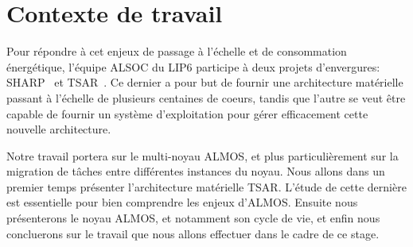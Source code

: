 \section{Contexte de travail}
\label{sec:context}

  

  Pour répondre à cet enjeux de passage à l'échelle et de consommation
  énergétique, l'équipe ALSOC du LIP6 participe à deux projets d'envergures:
  SHARP~\cite{sharp2012} et TSAR~\cite{tsar2008}. Ce dernier a pour but de
  fournir une architecture matérielle passant à l'échelle de plusieurs centaines
  de coeurs, tandis que l'autre se veut être capable de fournir un système
  d'exploitation pour gérer efficacement cette nouvelle architecture.

  Notre travail portera sur le multi-noyau ALMOS, et plus particulièrement sur
  la migration de tâches entre différentes instances du noyau. Nous allons dans
  un premier temps présenter l'architecture matérielle TSAR. L'étude de cette
  dernière est essentielle pour bien comprendre les enjeux d'ALMOS. Ensuite nous
  présenterons le noyau ALMOS, et notamment son cycle de vie, et enfin nous
  concluerons sur le travail que nous allons effectuer dans le cadre de ce
  stage.
  

